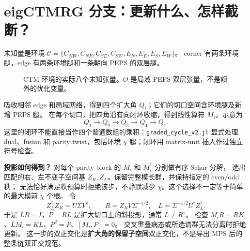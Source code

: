 \clearpage
\section{eigCTMRG 分支：更新什么、怎样截断？}

未知量是环境 $\mathcal C=\{C_{NW},C_{NE},C_{SE},C_{SW},E_N,E_E,E_S,E_W\}$。
corner 有两条环境腿，edge 有两条环境腿和一条朝向 PEPS 的双层腿。
\begin{figure}[H]\centering
{}
\caption{CTM 环境的实际八个未知张量。$O$ 是局域 PEPS 双层张量，不是额外的优化变量。}
\end{figure}

吸收相邻 edge 和局域网络，得到四个扩大角 $Q_i$；它们的切口空间含环境腿及新增 PEPS 腿。
在每个切口，把四角沿有向闭环收缩，得到线性算符 $M_i$。示意为
\[
Q_1\longrightarrow Q_2\longrightarrow Q_3\longrightarrow Q_4\longrightarrow Q_1.
\]
这里的闭环不能直接当作四个普通数组的乘积：\texttt{graded\_cycle\_v2.jl}
显式处理 dual、fusion 和 parity twist，包括环境 $\chi$ 腿；闭环用 matrix-unit 插入作过独立符号检查。

\textbf{投影如何得到？} 对每个 parity block 的 $M_i$ 和 $M_i^\dagger$ 分别做有序 Schur 分解，
选出匹配的右、左不变子空间基 $Z_R,Z_L$。保留完整模长群，并保持指定的 even/odd 秩；
无法恰好满足秩预算时拒绝该步，不静默减少 $\chi$。这个选择不一定等于简单的最大模前 $\chi$ 个根。
令
\[
Z_L^\dagger Z_R=U\Sigma V^\dagger,\qquad
R=Z_RV\Sigma^{-1/2},\quad L=\Sigma^{-1/2}U^\dagger Z_L^\dagger.
\]
于是 $LR=I$，$P=RL$ 是扩大切口上的斜投影，通常 $L\ne R^\dagger$。
检查 $M_iR=RK$、$LM_i=KL$、$P^2=P$、$[M_i,P]=0$。
交叉重叠病态或所选谱群无法分离时拒绝更新。
这一步的双正交化是\textbf{扩大角的保留子空间}双正交化，不是导出 MPS 后的整条链双正交规范。

\clearpage
